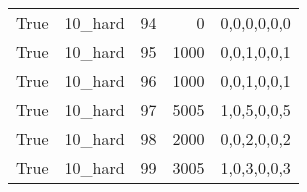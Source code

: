 \begin{tabular}{llrrl}
 True            & 10\_hard             &            94 &                     0 & 0,0,0,0,0,0   \\
 True            & 10\_hard             &            95 &                  1000 & 0,0,1,0,0,1   \\
 True            & 10\_hard             &            96 &                  1000 & 0,0,1,0,0,1   \\
 True            & 10\_hard             &            97 &                  5005 & 1,0,5,0,0,5   \\
 True            & 10\_hard             &            98 &                  2000 & 0,0,2,0,0,2   \\
 True            & 10\_hard             &            99 &                  3005 & 1,0,3,0,0,3   \\
\hline
\end{tabular}